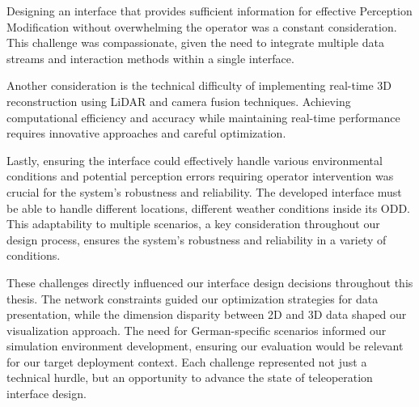 Designing an interface that provides sufficient information for effective Perception Modification without overwhelming the operator was a constant consideration. This challenge was compassionate, given the need to integrate multiple data streams and interaction methods within a single interface.

Another consideration is the technical difficulty of implementing real-time 3D reconstruction using \ac{LiDAR} and camera fusion techniques. Achieving computational efficiency and accuracy while maintaining real-time performance requires innovative approaches and careful optimization.

Lastly, ensuring the interface could effectively handle various environmental conditions and potential perception errors requiring operator intervention was crucial for the system's robustness and reliability. The developed interface must be able to handle different locations, different weather conditions
inside its \ac{ODD}. This adaptability to multiple scenarios, a key consideration throughout our design process, ensures the system's robustness and reliability in a variety of conditions.

These challenges directly influenced our interface design decisions throughout this thesis. The network constraints guided our optimization strategies for data presentation, while the dimension disparity between 2D and 3D data shaped our visualization approach. The need for German-specific scenarios informed our simulation environment development, ensuring our evaluation would be relevant for our target deployment context. Each challenge represented not just a technical hurdle, but an opportunity to advance the state of teleoperation interface design.
